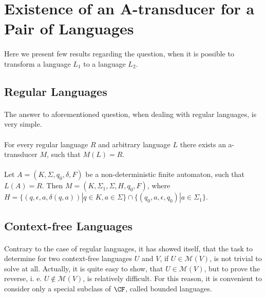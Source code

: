 \section{Existence of an A-transducer for a Pair of Languages}
\paragraph{}
Here we present few results regarding the question, when it is possible to transform a language $L_{1}$ to a language $L_{2}$.

\subsection{Regular Languages}
\paragraph{}
The answer to aforementioned question, when dealing with regular languages, is very simple.

\paragraph{}
\cveta For every regular language $R$ and arbitrary language $L$ there exists an a-transducer $M$, such that $M(L) = R$.

\paragraph{}
\dokaz Let $A = (K, \Sigma, q_{0}, \delta, F)$ be a non-deterministic finite automaton, such that $L(A) = R$. Then $M=(K, \Sigma_{1}, \Sigma, H, q_{0}, F)$, where $H=\{ (q, \epsilon , a, \delta (q,a)) | q \in K, a \in \Sigma \} \cap \{ (q_{0}, a, \epsilon, q_{0}) | a \in \Sigma_{1} \} $. \square

\subsection{Context-free Languages}
\paragraph{}
Contrary to the case of regular languages, it has showed itself, that the task to determine for two context-free languages $U$ and $V$, if $U \in \mathcal{M}(V)$, is not trivial to solve at all. Actually, it is quite easy to show, that $U \in \mathcal{M}(V)$, but to prove the reverse, i. e. $U \notin \mathcal{M}(V)$, is relatively difficult. For this reason, it is convenient to consider only a special subclass of $\CF $, called bounded languages.


